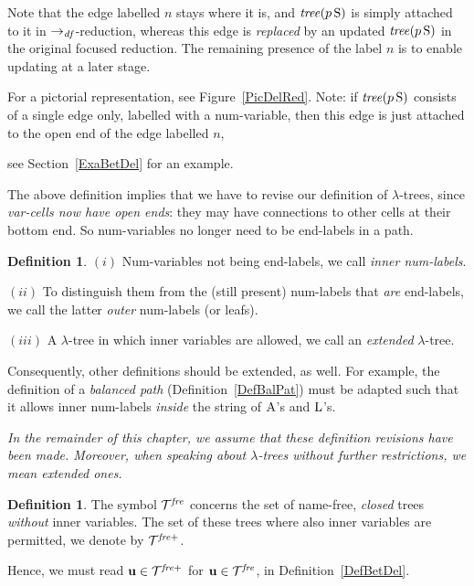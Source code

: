 \documentclass{article}
\theoremstyle{plain}
\theoremstyle{definition}
\newtheorem{Def}[The]{Definition}
\begin{document}
Note that the edge labelled $n$ stays where it is, and ${\it tree}(p \, {\rm S}) $ is simply attached to it in $\rightarrow_{\it df}$-reduction, whereas this edge is {\it replaced\/} by an updated ${\it tree}(p \, {\rm S})$ in the original focused reduction. The remaining presence of the label $n$ is to enable updating at a later stage.

For a pictorial representation, see Figure~\ref{PicDelRed}. Note: if ${\it tree}(p \, {\rm S}) $ consists of a single edge only, labelled with a num-variable, then this edge is just attached to the open end of the edge labelled $n$, {see Section~\ref{ExaBetDel} for an example.

\smallskip

The above definition implies that we have to revise our definition of $\lambda$-trees, since {\it var-cells now have open ends\/}: they may have connections to other cells at their bottom end. So num-variables no longer need to be end-labels in a path.

\begin{Def}\label{DefInnOut}
$(i)$ Num-variables not being end-labels, we call {\it inner num-labels\/}.

$(ii)$ To distinguish them from the (still present) num-labels that {\it are\/} end-labels, we call the latter {\it outer\/} num-labels (or leafs).

$(iii)$ A $\lambda$-tree in which inner variables are allowed, we call an {\em extended\/} $\lambda$-tree.
\end{Def}

Consequently, other definitions should be extended, as well. For example, the definition of a {\it balanced path\/} (Definition~\ref{DefBalPat}) must be adapted such that it allows inner num-labels {\em inside\/} the string of ${\rm A}$'s and ${\rm L}$'s.

\smallskip

{\it In the remainder of this chapter, we assume that these definition revisions have been made. Moreover, when speaking about $\lambda$-trees without further restrictions, we mean {\em extended} ones.}

\smallskip

\begin{Def}\label{DefTreFre}
The symbol ${\cal T}^{\it fre}$ concerns the set of name-free, {\em closed\/} trees {\it without\/} inner variables. The set of these trees where also inner variables are permitted, we denote by ${\cal T}^{\it fre+}$.

Hence, we must read ${\bf u} \in {\cal T}^{\it fre+}$ for ${\bf u} \in {\cal T}^{\it fre}$, in Definition~\ref{DefBetDel}.
\end{Def}

}
\end{document}
